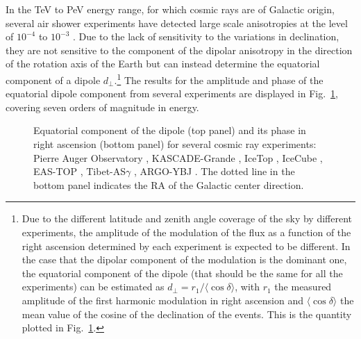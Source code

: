\documentclass[twoside,12pt]{article}
\begin{document}
In the TeV to PeV energy range, for which cosmic rays  are of Galactic origin, several air shower experiments have detected large scale anisotropies  at the level of $10^{-4}$ to $10^{-3}$ \cite{am05,gu07,ag09,ic10,it13,am15,argo15,ic16}. Due to the lack of sensitivity to the variations in declination, they are not sensitive to the component of the dipolar anisotropy in the direction of the rotation axis of the Earth but can instead determine the equatorial component of a dipole $d_\perp$.\footnote{Due to the different latitude and zenith angle coverage of the sky by different experiments, the amplitude of the modulation of the flux as a function of the right ascension determined by each experiment is expected to be different. In the case that the dipolar component of the modulation is the dominant one, the equatorial component of the dipole (that should be the same for all the experiments) can be estimated as $d_{\perp} = r_1/\langle\cos\delta\rangle$, with $r_1$ the measured amplitude of the first harmonic modulation in right ascension and $\langle\cos\delta\rangle$ the mean value of the cosine of the declination of the events. This is the quantity plotted in Fig.~\ref{dipexp}.} The results for the amplitude and phase of the equatorial dipole component from several experiments are displayed in Fig.~\ref{dipexp}, covering seven orders of magnitude in energy.

\begin{figure}[t]
\begin{center}
\begin{minipage}[t]{8 cm}
\centerline{}
\end{minipage}
\begin{minipage}[t]{16.5 cm}
\caption{Equatorial component of the dipole (top panel) and its phase in right ascension (bottom panel) for several cosmic ray experiments: Pierre Auger Observatory \cite{paoicrc15,
LS17},
KASCADE-Grande \cite{ch16}, IceTop \cite{ic12,ic16}, IceCube \cite{ic16}, EAS-TOP \cite{ag09}, Tibet-AS$\gamma$ \cite{am05,am15}, ARGO-YBJ \cite{argo15}. The dotted line in the bottom panel  indicates the RA of the Galactic center direction. \label{dipexp}}
\end{minipage}
\end{center}
\end{figure}
\end{document}
